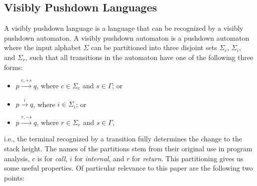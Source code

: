 \documentclass[runningheads]{llncs}
\newcommand{\T}{\Sigma} %
\begin{document}
\subsection{Visibly Pushdown Languages} \label{sec:preliminaries-vpls}

A visibly pushdown language \cite{alurVisiblyPushdownLanguages2004} is a language that can be recognized by a visibly pushdown automaton. A visibly pushdown automaton is a pushdown automaton where the input alphabet $\T$ can be partitioned into three disjoint sets $\T_c$, $\T_i$, and $\T_r$, such that all transitions in the automaton have one of the following three forms:

\begin{itemize}
\item $p \xrightarrow{c, +s} q$, where $c \in \T_c$ and $s \in \Gamma$; or
\item $p \xrightarrow{i} q$, where $i \in \T_i$; or
\item $p \xrightarrow{r, -s} q$, where $r \in \T_r$ and $s \in \Gamma$,
\end{itemize}

\noindent i.e., the terminal recognized by a transition fully determines the change to the stack height.
%
The names of the partitions stem from their original use in program analysis, $c$ is for \emph{call}, $i$ for \emph{internal}, and $r$ for \emph{return}.
%
This partitioning gives us some useful properties. Of particular relevance to this paper are the following two points:
\end{document}

